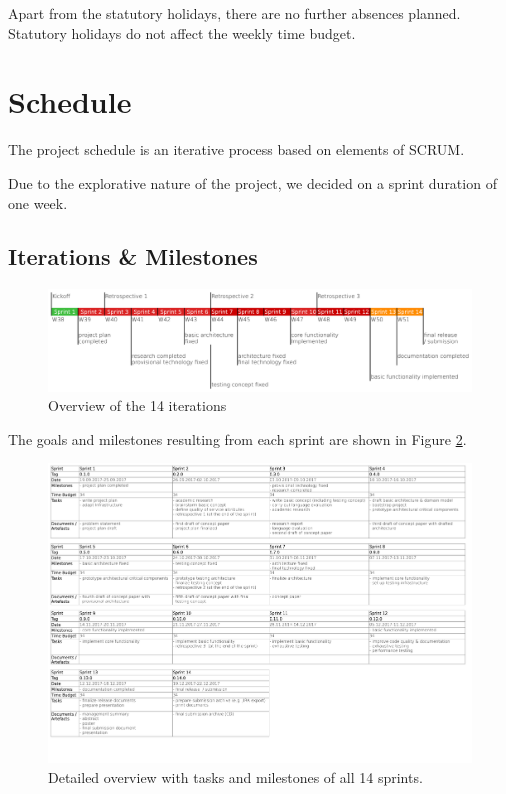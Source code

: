 Apart from the statutory holidays, there are no further absences planned. Statutory holidays do not affect the weekly time budget.

\section{Schedule}
The project schedule is an iterative process based on elements of SCRUM. 

Due to the explorative nature of the project, we decided on a sprint duration of one week.
\subsection{Iterations \& Milestones}

\begin{figure}[h!]
	\centering
	\includegraphics[width=1\linewidth]{resources/overview}
	\caption{Overview of the 14 iterations}
	\label{fig:overview}
\end{figure}

The goals and milestones resulting from each sprint are shown in Figure \ref{fig:sprint-details}.

\begin{figure}[h]
	\begin{sideways}
	\includegraphics[scale=0.75]{resources/sprint_details}
	\end{sideways}
	\centering
	\caption{Detailed overview with tasks and milestones of all 14 sprints.}
	\label{fig:sprint-details}
\end{figure}


